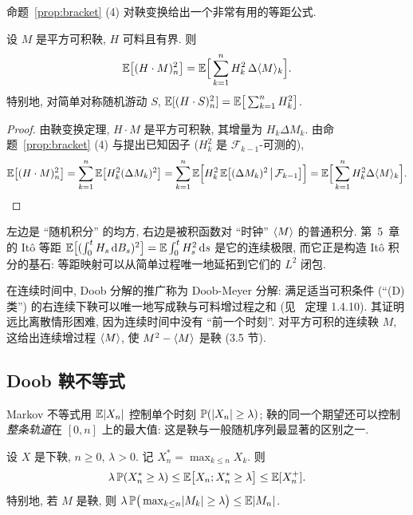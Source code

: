 命题~\ref{prop:bracket} (4) 对鞅变换给出一个非常有用的等距公式.

\begin{corollary}[离散 Itô 等距]\label{cor:discrete-ito-isometry}
设 $M$ 是平方可积鞅, $H$ 可料且有界. 则
\[
\mathbb{E}\big[(H\cdot M)_n^2\big]=\mathbb{E}\Big[\sum_{k=1}^nH_k^2\,\Delta\langle M\rangle_k\Big].
\]
特别地, 对简单对称随机游动 $S$, $\mathbb{E}[(H\cdot S)_n^2]=\mathbb{E}\big[\sum_{k=1}^nH_k^2\big]$.
\end{corollary}

\begin{proof}
由鞅变换定理, $H\cdot M$ 是平方可积鞅, 其增量为 $H_k\Delta M_k$. 由命题~\ref{prop:bracket} (4) 与提出已知因子 ($H_k^2$ 是 $\mathcal{F}_{k-1}$-可测的),
\[
\mathbb{E}\big[(H\cdot M)_n^2\big]=\sum_{k=1}^n\mathbb{E}\big[H_k^2(\Delta M_k)^2\big]=\sum_{k=1}^n\mathbb{E}\Big[H_k^2\,\mathbb{E}\big[(\Delta M_k)^2\,\big|\,\mathcal{F}_{k-1}\big]\Big]=\mathbb{E}\Big[\sum_{k=1}^nH_k^2\Delta\langle M\rangle_k\Big].\qedhere
\]
\end{proof}

\begin{intuition}
左边是 ``随机积分'' 的均方, 右边是被积函数对 ``时钟'' $\langle M\rangle$ 的普通积分. 第~5~章的 Itô 等距 $\mathbb{E}\big[(\int_0^tH_s\mathop{}\!\mathrm{d} B_s)^2\big]=\mathbb{E}\int_0^tH_s^2\mathop{}\!\mathrm{d} s$ 是它的连续极限, 而它正是构造 Itô 积分的基石: 等距映射可以从简单过程唯一地延拓到它们的 $L^2$ 闭包.
\end{intuition}

\begin{remark}
在连续时间中, Doob 分解的推广称为 Doob-Meyer 分解: 满足适当可积条件 (``(D) 类'') 的右连续下鞅可以唯一地写成鞅与可料增过程之和 (见~\cite{karatzas} 定理 1.4.10). 其证明远比离散情形困难, 因为连续时间中没有 ``前一个时刻''. 对平方可积的连续鞅 $M$, 这给出连续增过程 $\langle M\rangle$, 使 $M^2-\langle M\rangle$ 是鞅 (3.5 节).
\end{remark}

\subsection{Doob 鞅不等式}

Markov 不等式用 $\mathbb{E}\lvert X_n\rvert$ 控制单个时刻 $\mathbb{P}(\lvert X_n\rvert\ge\lambda)$; 鞅的同一个期望还可以控制\emph{整条轨道}在 $[0,n]$ 上的最大值: 这是鞅与一般随机序列最显著的区别之一.

\begin{theorem}\label{thm:doob-maximal}
设 $X$ 是下鞅, $n\ge0$, $\lambda>0$. 记 $X^*_n=\max_{k\le n}X_k$. 则
\[
\lambda\,\mathbb{P}(X^*_n\ge\lambda)\le\mathbb{E}\big[X_n;X^*_n\ge\lambda\big]\le\mathbb{E}[X_n^+].
\]
特别地, 若 $M$ 是鞅, 则 $\lambda\,\mathbb{P}\big(\max_{k\le n}\lvert M_k\rvert\ge\lambda\big)\le\mathbb{E}\lvert M_n\rvert$.
\end{theorem}

